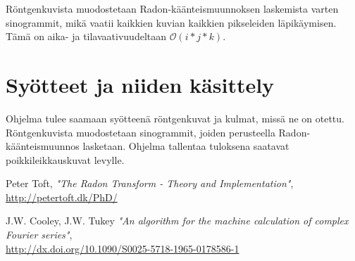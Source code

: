 \documentclass[12pt,a4paper]{report}
\begin{document}
    Röntgenkuvista muodostetaan Radon-käänteismuunnoksen laskemista varten sinogrammit, mikä vaatii kaikkien kuvian kaikkien pikseleiden läpikäymisen. Tämä on aika- ja tilavaativuudeltaan $\mathcal O(i*j*k)$.
    
    \section*{Syötteet ja niiden käsittely}
    Ohjelma tulee saamaan syötteenä röntgenkuvat ja kulmat, missä ne on otettu. Röntgenkuvista muodostetaan sinogrammit, joiden perusteella Radon-käänteismuunnos lasketaan. Ohjelma tallentaa tuloksena saatavat poikkileikkauskuvat levylle.
    
    \newpage

    \begin{thebibliography}{6}
	    Peter Toft, 
	    \emph{"The Radon Transform - Theory and Implementation"},\\
        	\url{http://petertoft.dk/PhD/}
        	
	    J.W. Cooley, J.W. Tukey 
	    \emph{"An algorithm for the machine calculation of complex Fourier series"},\\
        	\url{http://dx.doi.org/10.1090/S0025-5718-1965-0178586-1}
    \end{thebibliography}
\end{document}

